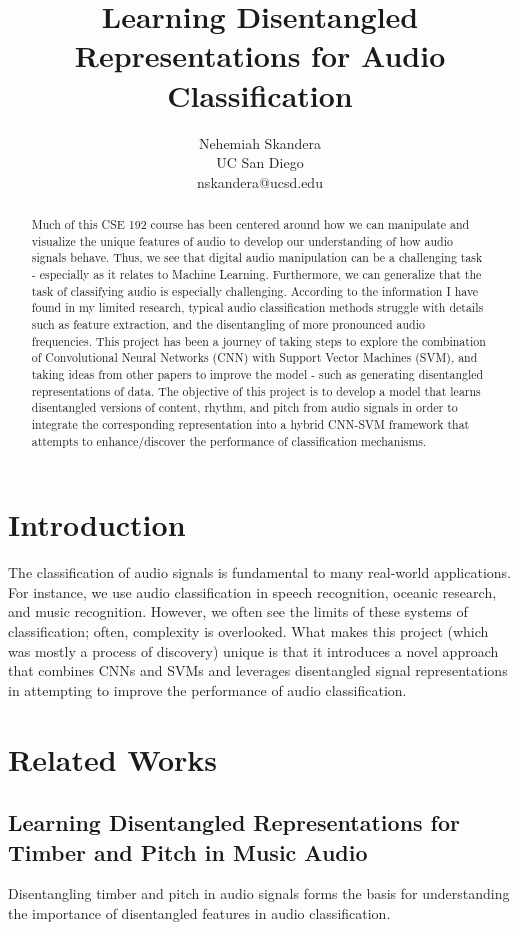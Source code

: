 \documentclass{article}
\title{Learning Disentangled Representations for Audio Classification}
\author{
  Nehemiah Skandera \\
  UC San Diego \\
  nskandera@ucsd.edu
}
\begin{document}
\maketitle

\begin{abstract}
Much of this CSE 192 course has been centered around how we can manipulate and visualize the unique features of audio to develop our understanding of how audio signals behave. Thus, we see that digital audio manipulation can be a challenging task - especially as it relates to Machine Learning. Furthermore, we can generalize that the task of classifying audio is especially challenging. According to the information I have found in my limited research, typical audio classification methods struggle with details such as feature extraction, and the disentangling of more pronounced audio frequencies. This project has been a journey of taking steps to explore the combination of Convolutional Neural Networks (CNN) with Support Vector Machines (SVM), and taking ideas from other papers to improve the model - such as generating disentangled representations of data. The objective of this project is to develop a model that learns disentangled versions of content, rhythm, and pitch from audio signals in order to integrate the corresponding representation into a hybrid CNN-SVM framework that attempts to enhance/discover the performance of classification mechanisms.
\end{abstract}

\section{Introduction}
The classification of audio signals is fundamental to many real-world applications. For instance, we use audio classification in speech recognition, oceanic research, and music recognition. However, we often see the limits of these systems of classification; often, complexity is overlooked. What makes this project (which was mostly a process of discovery) unique is that it introduces a novel approach that combines CNNs and SVMs and leverages disentangled signal representations in attempting to improve the performance of audio classification.


\section{Related Works}
\subsection{Learning Disentangled Representations for Timber and Pitch in Music Audio}
\citet{disentangled_representations} Disentangling timber and pitch in audio signals forms the basis for understanding the importance of disentangled features in audio classification.
\end{document}
